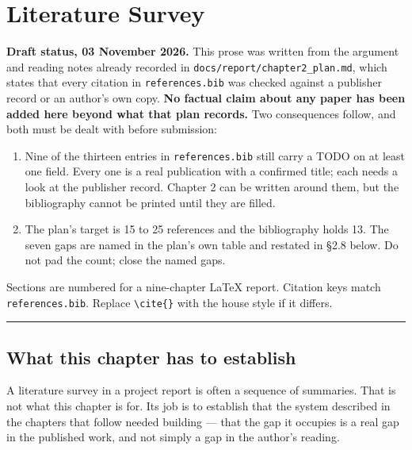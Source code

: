 \hypertarget{literature-survey}{%
\chapter{Literature Survey}\label{literature-survey}}

\begin{draftnote}

\textbf{Draft status, 03 November 2026.} This prose was written from the
argument and reading notes already recorded in
\texttt{docs/report/chapter2\_plan.md}, which states that every citation
in \texttt{references.bib} was checked against a publisher record or an
author's own copy. \textbf{No factual claim about any paper has been
added here beyond what that plan records.} Two consequences follow, and
both must be dealt with before submission:

\begin{enumerate}
\def\labelenumi{\arabic{enumi}.}
\tightlist
\item
  Nine of the thirteen entries in \texttt{references.bib} still carry a
  TODO on at least one field. Every one is a real publication with a
  confirmed title; each needs a look at the publisher record. Chapter 2
  can be written around them, but the bibliography cannot be printed
  until they are filled.
\item
  The plan's target is 15 to 25 references and the bibliography holds
  13. The seven gaps are named in the plan's own table and restated in
  \S{}2.8 below. Do not pad the count; close the named gaps.
\end{enumerate}

Sections are numbered for a nine-chapter LaTeX report. Citation keys
match \texttt{references.bib}. Replace \texttt{\textbackslash{}cite\{\}}
with the house style if it differs.

\end{draftnote}

\begin{center}\rule{0.5\linewidth}{0.5pt}\end{center}

\hypertarget{what-this-chapter-has-to-establish}{%
\section{What this chapter has to
establish}\label{what-this-chapter-has-to-establish}}

A literature survey in a project report is often a sequence of
summaries. That is not what this chapter is for. Its job is to establish
that the system described in the chapters that follow needed building
--- that the gap it occupies is a real gap in the published work, and
not simply a gap in the author's reading.

